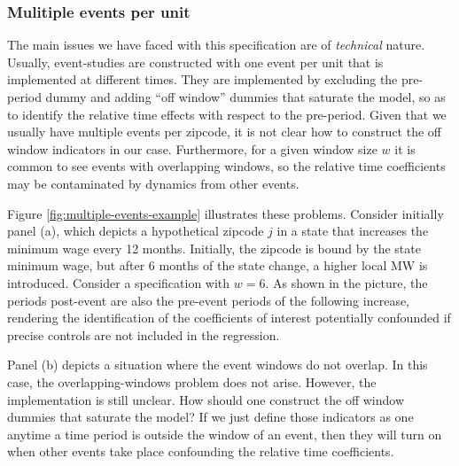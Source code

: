 \subsubsection{Mulitiple events per unit}

    The main issues we have faced with this specification are of \textit{technical} nature. Usually, event-studies are constructed with one event per unit that is implemented at different times. They are implemented by excluding the pre-period dummy and adding ``off window'' dummies that saturate the model, so as to identify the relative time effects with respect to the pre-period. Given that we usually have multiple events per zipcode, it is not clear how to construct the off window indicators in our case. Furthermore, for a given window size $w$ it is common to see events with overlapping windows, so the relative time coefficients may be contaminated by dynamics from other events. 
    
    Figure \ref{fig:multiple-events-example} illustrates these problems. Consider initially panel (a), which depicts a hypothetical zipcode $j$ in a state that increases the minimum wage every 12 months. Initially, the zipcode is bound by the state minimum wage, but after 6 months of the state change, a higher local MW is introduced. Consider a specification with $w = 6$. As shown in the picture, the periods post-event are also the pre-event periods of the following increase, rendering the identification of the coefficients of interest potentially confounded if precise controls are not included in the regression.
    
    Panel (b) depicts a situation where the event windows do not overlap. In this case, the overlapping-windows problem does not arise. However, the implementation is still unclear. How should one construct the off window dummies that saturate the model? If we just define those indicators as one anytime a time period is outside the window of an event, then they will turn on when other events take place confounding the relative time coefficients.
    
